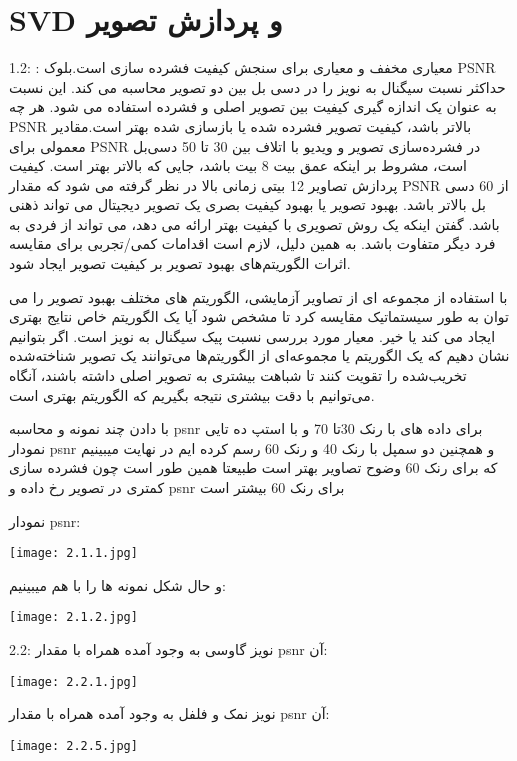 \section{SVD و پردازش تصویر}
\large
1.2:
:
معیاری مخفف 
و معیاری برای سنجش کیفیت فشرده سازی است.بلوک PSNR حداکثر نسبت سیگنال به نویز را در دسی بل بین دو تصویر محاسبه می کند. این نسبت به عنوان یک اندازه گیری کیفیت بین تصویر اصلی و فشرده استفاده می شود. هر چه PSNR بالاتر باشد، کیفیت تصویر فشرده شده یا بازسازی شده بهتر است.مقادیر معمولی برای PSNR در فشرده‌سازی تصویر و ویدیو با اتلاف بین 30 تا 50 دسی‌بل است، مشروط بر اینکه عمق بیت 8 بیت باشد، جایی که بالاتر بهتر است. کیفیت پردازش تصاویر 12 بیتی زمانی بالا در نظر گرفته می شود که مقدار PSNR از 60 دسی بل بالاتر باشد.
بهبود تصویر یا بهبود کیفیت بصری یک تصویر دیجیتال می تواند ذهنی باشد. گفتن اینکه یک روش تصویری با کیفیت بهتر ارائه می دهد، می تواند از فردی به فرد دیگر متفاوت باشد. به همین دلیل، لازم است اقدامات کمی/تجربی برای مقایسه اثرات الگوریتم‌های بهبود تصویر بر کیفیت تصویر ایجاد شود.
 
با استفاده از مجموعه ای از تصاویر آزمایشی، الگوریتم های مختلف بهبود تصویر را می توان به طور سیستماتیک مقایسه کرد تا مشخص شود آیا یک الگوریتم خاص نتایج بهتری ایجاد می کند یا خیر. معیار مورد بررسی نسبت پیک سیگنال به نویز است. اگر بتوانیم نشان دهیم که یک الگوریتم یا مجموعه‌ای از الگوریتم‌ها می‌توانند یک تصویر شناخته‌شده تخریب‌شده را تقویت کنند تا شباهت بیشتری به تصویر اصلی داشته باشند، آنگاه می‌توانیم با دقت بیشتری نتیجه بگیریم که الگوریتم بهتری است.

با دادن چند نمونه و محاسبه  psnr  برای داده های با رنک 30تا 70 و با استپ ده تایی نمودار  psnr و همچنین دو سمپل  با رنک 40 و رنک 60 رسم کرده ایم در نهایت میبینیم که برای رنک 60 وضوح تصاویر بهتر است طبیعتا همین طور است چون فشرده سازی کمتری در تصویر رخ داده و  psnr  برای رنک 60 بیشتر است
 

نمودار psnr:

\begin{center}
    \texttt{[image: 2.1.1.jpg]}
\end{center}

و حال شکل نمونه ها را با هم میبینیم:

\begin{center}
    \texttt{[image: 2.1.2.jpg]}
\end{center}

2.2:
نویز گاوسی به وجود آمده همراه با مقدار psnr آن:
\begin{center}
    \texttt{[image: 2.2.1.jpg]}
\end{center}
نویز نمک و فلفل به وجود آمده همراه با مقدار psnr آن:
\begin{center}
    \texttt{[image: 2.2.5.jpg]}
\end{center}

